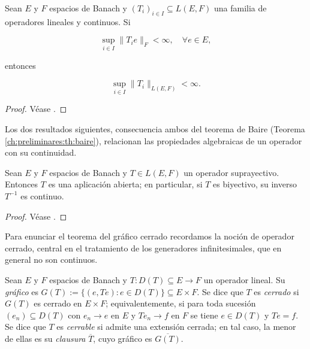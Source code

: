 \begin{Teorema}
\label{ch:preliminares:th:banachSteinhaus}

Sean $E$ y $F$ espacios de Banach y $(T_i)_{i \in I} \subseteq L(E, F)$ una
familia de operadores lineales y continuos. Si

\[\sup_{i \in I} \lVert T_i e \rVert_F < \infty, \quad \forall e \in E,\]

entonces

\[\sup_{i \in I} \lVert T_i \rVert_{L(E, F)} < \infty.\]
\end{Teorema}

\begin{proof}
Véase \cite[Teorema~2.2]{brezis-2011-fun-ana-sob}.
\end{proof}

Los dos resultados siguientes, consecuencia ambos del teorema de Baire
(Teorema \ref{ch:preliminares:th:baire}), relacionan
las propiedades algebraicas de un operador con su continuidad.\\

\begin{Teorema}
\label{ch:preliminares:th:aplicacionAbierta}

Sean $E$ y $F$ espacios de Banach y $T \in L(E, F)$ un operador suprayectivo.
Entonces $T$ es una aplicación abierta; en particular, si $T$ es biyectivo, su
inverso $T^{-1}$ es continuo.
\end{Teorema}

\begin{proof}
Véase \cite[Teorema~2.6]{brezis-2011-fun-ana-sob}.
\end{proof}

Para enunciar el teorema del gráfico cerrado recordamos la noción de operador
cerrado, central en el tratamiento de los generadores infinitesimales, que en
general no son continuos.\\

\begin{Definicion}
\label{ch:preliminares:def:cerrado}

Sean $E$ y $F$ espacios de Banach y $T : D(T) \subseteq E \rightarrow F$ un
operador lineal. Su \textit{gráfico} es
$G(T) := \{(e, Te) : e \in D(T)\} \subseteq E \times F$. Se dice que $T$ es
\textit{cerrado} si $G(T)$ es cerrado en $E \times F$; equivalentemente, si para
toda sucesión $(e_n) \subseteq D(T)$ con $e_n \rightarrow e$ en $E$ y
$Te_n \rightarrow f$ en $F$ se tiene $e \in D(T)$ y $Te = f$. Se dice que $T$ es
\textit{cerrable} si admite una extensión cerrada; en tal caso, la menor de ellas
es su \textit{clausura} $\overline{T}$, cuyo gráfico es $\overline{G(T)}$.
\end{Definicion}

